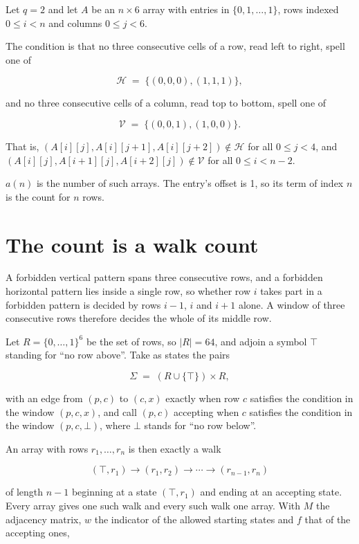 \documentclass[11pt]{article}
\theoremstyle{definition}
\begin{document}
Let $q = 2$ and let $A$ be an $n \times 6$ array with entries in $\{0,1,\dots,1\}$, rows indexed $0 \le i < n$ and columns $0 \le j < 6$.

The condition is that no three consecutive cells of a row, read left to right, spell one of

\[\mathcal{H} \;=\; \{(0,0,0), (1,1,1)\},\]

and no three consecutive cells of a column, read top to bottom, spell one of

\[\mathcal{V} \;=\; \{(0,0,1), (1,0,0)\}.\]

That is, $(A[i][j],A[i][j{+}1],A[i][j{+}2]) \notin \mathcal{H}$ for all $0 \le j < 4$, and $(A[i][j],A[i{+}1][j],A[i{+}2][j]) \notin \mathcal{V}$ for all $0 \le i < n-2$.

$a(n)$ is the number of such arrays. The entry's offset is 1, so its term of index $n$ is the count for $n$ rows.

\section{The count is a walk count}

A forbidden vertical pattern spans three consecutive rows, and a forbidden horizontal pattern lies inside a single row, so whether row $i$ takes part in a forbidden pattern is decided by rows $i-1$, $i$ and $i+1$ alone. A window of three consecutive rows therefore decides the whole of its middle row.

Let $R = \{0,\dots,1\}^{6}$ be the set of rows, so $|R| = 64$, and adjoin a symbol $\top$ standing for ``no row above''. Take as states the pairs

\[\Sigma \;=\; (R \cup \{\top\}) \times R,\]

with an edge from $(p,c)$ to $(c,x)$ exactly when row $c$ satisfies the condition in the window $(p,c,x)$, and call $(p,c)$ accepting when $c$ satisfies the condition in the window $(p,c,\bot)$, where $\bot$ stands for ``no row below''.

An array with rows $r_1,\dots,r_n$ is then exactly a walk

\[(\top,r_1) \to (r_1,r_2) \to \cdots \to (r_{n-1},r_n)\]

of length $n-1$ beginning at a state $(\top,r_1)$ and ending at an accepting state. Every array gives one such walk and every such walk one array. With $M$ the adjacency matrix, $w$ the indicator of the allowed starting states and $f$ that of the accepting ones,
\end{document}
